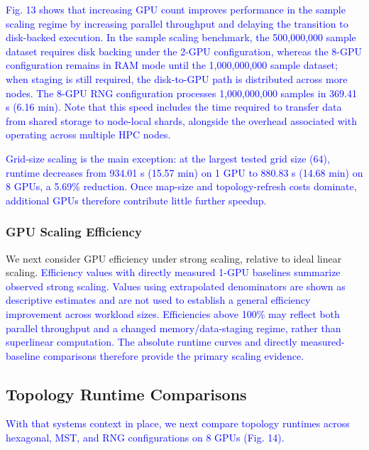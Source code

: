 \documentclass[10pt]{article} %
\newcommand{\TrackedChange}[1]{\textcolor{blue}{#1}}
\begin{document}
\TrackedChange{Fig. 13 shows that increasing GPU count improves performance in the sample scaling regime by increasing parallel throughput and delaying the transition to disk-backed execution.} \TrackedChange{In the sample scaling benchmark, the 500,000,000 sample dataset requires disk backing under the 2-GPU configuration, whereas the 8-GPU configuration remains in RAM mode until the 1,000,000,000 sample dataset; when staging is still required, the disk-to-GPU path is distributed across more nodes.} \TrackedChange{The 8-GPU RNG configuration processes 1,000,000,000 samples in 369.41 s (6.16 min).} \TrackedChange{Note that this speed includes the time required to transfer data from shared storage to node-local shards, alongside the overhead associated with operating across multiple HPC nodes.}

\TrackedChange{Grid-size scaling is the main exception: at the largest tested grid size (64), runtime decreases from 934.01 s (15.57 min) on 1 GPU to 880.83 s (14.68 min) on 8 GPUs, a 5.69\% reduction.} \TrackedChange{Once map-size and topology-refresh costs dominate, additional GPUs therefore contribute little further speedup.}

\subsubsection{GPU Scaling Efficiency}

We next consider GPU efficiency under strong scaling, relative to ideal linear scaling. \TrackedChange{Efficiency values with directly measured 1-GPU baselines summarize observed strong scaling.} \TrackedChange{Values using extrapolated denominators are shown as descriptive estimates and are not used to establish a general efficiency improvement across workload sizes.} \TrackedChange{Efficiencies above 100\% may reflect both parallel throughput and a changed memory/data-staging regime, rather than superlinear computation.} \TrackedChange{The absolute runtime curves and directly measured-baseline comparisons therefore provide the primary scaling evidence.}

\subsection{Topology Runtime Comparisons}

\TrackedChange{With that systems context in place, we next compare topology runtimes across hexagonal, MST, and RNG configurations on 8 GPUs (Fig. 14).}
\end{document}
